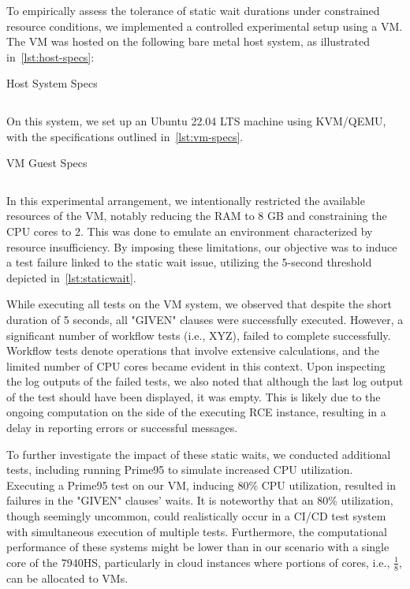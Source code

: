 To empirically assess the tolerance of static wait durations under constrained resource conditions, we implemented a controlled experimental setup using a \ac{VM}. The \ac{VM} was hosted on the following bare metal host system, as illustrated in~\cref{lst:host-specs}:

\begin{listing}
\caption{Host System Specs}
\label{lst:host-specs}
\inputminted{text}{files/neofetch-host.txt}
\end{listing}

On this system, we set up an Ubuntu 22.04 LTS machine using KVM/QEMU, with the specifications outlined in~\cref{lst:vm-specs}.
\begin{listing}
\caption{\acl{VM} Guest Specs}
\label{lst:vm-specs}
\inputminted{text}{files/neofetch-test-host.txt}
\end{listing}

In this experimental arrangement, we intentionally restricted the available resources of the \ac{VM}, notably reducing the RAM to 8 GB and constraining the CPU cores to 2. This was done to emulate an environment characterized by resource insufficiency. By imposing these limitations, our objective was to induce a test failure linked to the static wait issue, utilizing the 5-second threshold depicted in~\cref{lst:staticwait}. 

While executing all tests on the \ac{VM} system, we observed that despite the short duration of 5 seconds, all "GIVEN" clauses were successfully executed. However, a significant number of workflow tests (i.e., XYZ), failed to complete successfully. Workflow tests denote operations that involve extensive calculations, and the limited number of CPU cores became evident in this context. Upon inspecting the log outputs of the failed tests, we also noted that although the last log output of the test should have been displayed, it was empty. This is likely due to the ongoing computation on the side of the executing \ac{RCE} instance, resulting in a delay in reporting errors or successful messages.

To further investigate the impact of these static waits, we conducted additional tests, including running Prime95 to simulate increased CPU utilization. Executing a Prime95 test on our VM, inducing 80\% CPU utilization, resulted in failures in the "GIVEN" clauses' waits. It is noteworthy that an 80\% utilization, though seemingly uncommon, could realistically occur in a CI/CD test system with simultaneous execution of multiple tests. Furthermore, the computational performance of these systems might be lower than in our scenario with a single core of the 7940HS, particularly in cloud instances where portions of cores, i.e., $\frac{1}{8}$, can be allocated to \acp{VM}.

